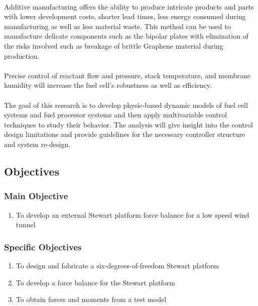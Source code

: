 \paragraph{}Additive manufacturing offers the ability to produce intricate products and parts with lower development costs, shorter lead times, less energy consumed during manufacturing as well as less material waste. This method can be used to manufacture delicate components such as the bipolar plates with elimination of the risks involved such as breakage of brittle Graphene material during production.     
\paragraph{}Precise control of reactant flow and pressure, stack temperature, and membrane humidity will increase the fuel cell’s robustness as well as efficiency.
\paragraph{}The goal of this research is to develop physic-based dynamic models of fuel cell systems and fuel processor systems and then apply multivariable control techniques to study their behavior. The analysis will give insight into the control design limitations and provide guidelines for the necessary controller structure and system re-design.

\subsection{Objectives}
\subsubsection{Main Objective}
\begin{enumerate}
\item To develop an external Stewart platform force balance for a low speed wind tunnel 
\end{enumerate}
\subsubsection{Specific Objectives}
\begin{enumerate}
\item To design and fabricate a six-degrees-of-freedom Stewart platform
\item To develop a force balance for the Stewart platform
\item To obtain forces and moments from a test model
\end{enumerate}
